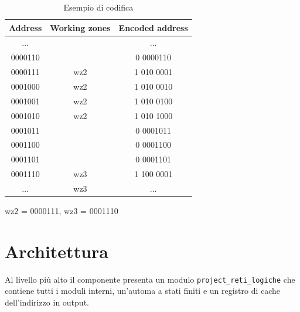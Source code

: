 \documentclass[a4paper]{article}
\begin{document}
\begin{table}[H]
  \centering
  \ttfamily
  \begin{tabular} {|c|c|c|}
    \hline
    \bf{Address} & \bf{Working zones}          & \bf{Encoded address} \\
    \hline
    ...          &                             & ...                  \\
    \hline
    0000110      &                             & 0 0000110            \\
    \hline
    0000111      & \cellcolor[HTML]{E0E0E0}wz2 & 1 010 0001           \\
    \hline
    0001000      & \cellcolor[HTML]{E0E0E0}wz2 & 1 010 0010           \\
    \hline
    0001001      & \cellcolor[HTML]{E0E0E0}wz2 & 1 010 0100           \\
    \hline
    0001010      & \cellcolor[HTML]{E0E0E0}wz2 & 1 010 1000           \\
    \hline
    0001011      &                             & 0 0001011            \\
    \hline
    0001100      &                             & 0 0001100            \\
    \hline
    0001101      &                             & 0 0001101            \\
    \hline
    0001110      & \cellcolor[HTML]{E0E0E0}wz3 & 1 100 0001           \\
    \hline
    ...          & \cellcolor[HTML]{E0E0E0}wz3 & ...                  \\
    \hline
  \end{tabular}
  
  wz2 = 0000111, wz3 = 0001110
  \caption{Esempio di codifica}
  \label{tab:example}
\end{table}

\pagebreak
\section{Architettura}
Al livello più alto il componente presenta un modulo \texttt{project\_reti\_logiche} che contiene tutti i moduli interni, un'automa a stati finiti e un registro di cache dell'indirizzo in output.
\end{document}
